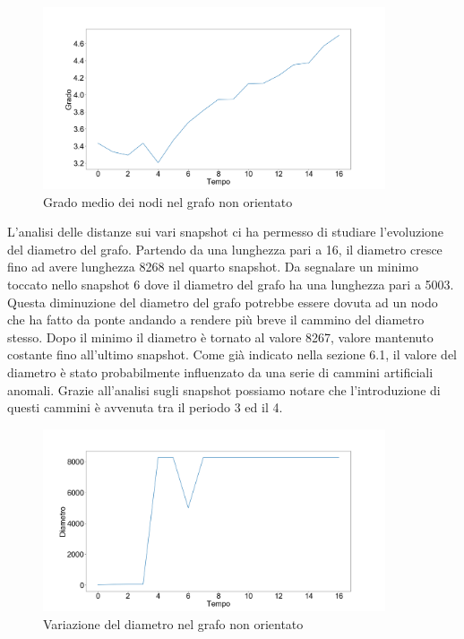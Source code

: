 \documentclass[12pt]{report}
\begin{document}
\begin{figure}[H]

\centering\includegraphics[width=0.9\textwidth]{GradoMedioUndir.png}
\caption{Grado medio dei nodi nel grafo non orientato}

\end{figure}


L'analisi delle distanze sui vari snapshot ci ha permesso di studiare l'evoluzione del diametro del grafo. Partendo da una lunghezza pari a 16, il diametro cresce fino ad avere lunghezza 8268 nel quarto snapshot. 
Da segnalare un minimo toccato nello snapshot 6 dove il diametro del grafo ha una lunghezza pari a 5003. Questa diminuzione del diametro del grafo potrebbe essere dovuta ad un nodo che ha fatto da ponte andando a rendere più breve il cammino del diametro stesso.
Dopo il minimo il diametro è tornato al valore 8267, valore mantenuto costante fino all'ultimo snapshot.
Come già indicato nella sezione 6.1, il valore del diametro è stato probabilmente influenzato da una serie di cammini artificiali anomali. Grazie all'analisi sugli snapshot possiamo notare che l'introduzione di questi cammini è avvenuta tra il periodo 3 ed il 4. 

\begin{figure}[H]
    \centering\includegraphics[width=0.9\textwidth]{Diametro.png}
    \caption{Variazione del diametro nel grafo non orientato}
\end{figure}
\end{document}
